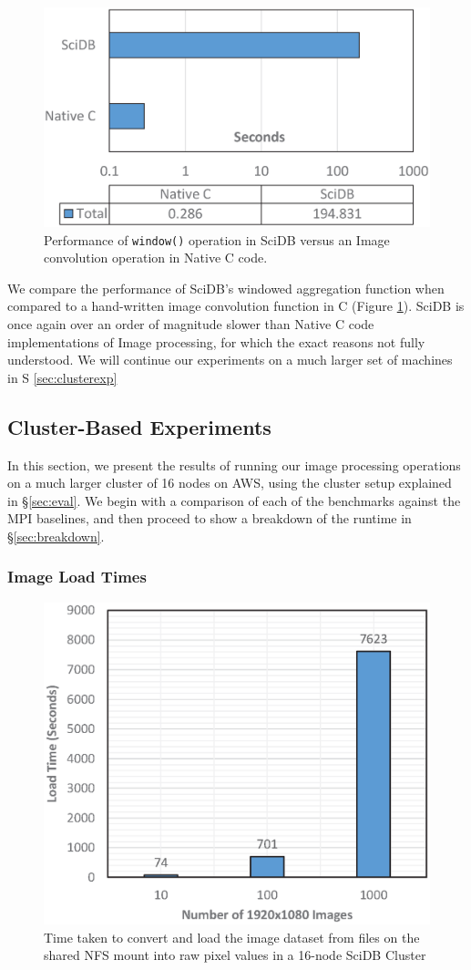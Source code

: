 \documentclass[letterpaper,twocolumn,10pt]{article}
\begin{document}
\begin{figure}[h]
\centering
\includegraphics[width=.55\textwidth]{figures/convo_single.eps}
\caption{Performance of \texttt{window()} operation in SciDB versus an Image convolution operation in Native C code.}
\label{fig:convo_result}
\end{figure}

We compare the performance of SciDB's windowed aggregation function when compared to a hand-written image convolution function in C (Figure \ref{fig:convo_result}). SciDB is once again over an order of magnitude slower than Native C code implementations of Image processing, for which the exact reasons not fully understood. We will continue our experiments on a much larger set of machines in S \ref{sec:clusterexp}

\subsection{Cluster-Based Experiments}
In this section, we present the results of running our image processing operations on a much larger cluster of 16 nodes on AWS, using the cluster setup explained in \S \ref{sec:eval}. We begin with a comparison of each of the benchmarks against the MPI baselines, and then proceed to show a breakdown of the runtime in \S\ref{sec:breakdown}.

\subsubsection{Image Load Times}

\begin{figure}[h]
\centering
\includegraphics[width=.50\textwidth]{figures/image_load.eps}
\caption{Time taken to convert and load the image dataset from files on the shared NFS mount into raw pixel values in a 16-node SciDB Cluster }
\label{fig:image_load}
\end{figure}
\end{document}
